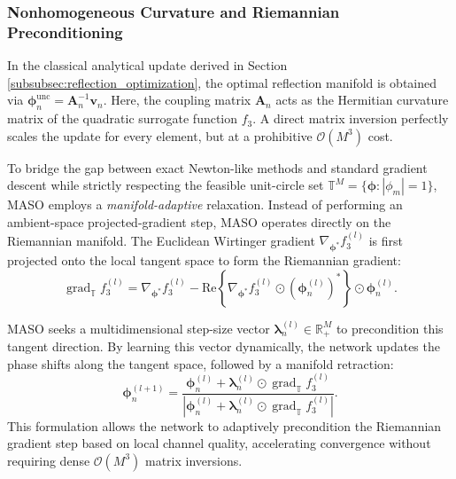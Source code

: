 \documentclass[journal]{IEEEtran}
\begin{document}
\subsubsection{Nonhomogeneous Curvature and Riemannian Preconditioning}
\label{subsubsec:neural_preconditioning}

In the classical analytical update derived in Section \ref{subsubsec:reflection_optimization}, the optimal reflection manifold is obtained via $\boldsymbol{\phi}_n^{\text{unc}} = \mathbf{A}_n^{-1} \mathbf{v}_n$. Here, the coupling matrix $\mathbf{A}_n$ acts as the Hermitian curvature matrix of the quadratic surrogate function $f_3$. A direct matrix inversion perfectly scales the update for every element, but at a prohibitive $\mathcal{O}(M^3)$ cost.

To bridge the gap between exact Newton-like methods and standard gradient descent while strictly respecting the feasible unit-circle set $\mathbb{T}^M = \{ \boldsymbol{\phi} : |\phi_m| = 1 \}$, MASO employs a \textit{manifold-adaptive} relaxation. Instead of performing an ambient-space projected-gradient step, MASO operates directly on the Riemannian manifold. The Euclidean Wirtinger gradient $\nabla_{\boldsymbol{\phi}^*} f_3^{(l)}$ is first projected onto the local tangent space to form the Riemannian gradient:
\begin{equation}
    \operatorname{grad}_{\mathbb{T}} f_3^{(l)} = \nabla_{\boldsymbol{\phi}^*} f_3^{(l)} - \text{Re} \left\{ \nabla_{\boldsymbol{\phi}^*} f_3^{(l)} \odot (\boldsymbol{\phi}_n^{(l)})^* \right\} \odot \boldsymbol{\phi}_n^{(l)}.
\end{equation}

MASO seeks a multidimensional step-size vector $\boldsymbol{\lambda}_n^{(l)} \in \mathbb{R}_+^M$ to precondition this tangent direction. By learning this vector dynamically, the network updates the phase shifts along the tangent space, followed by a manifold retraction:
\begin{equation}
    \boldsymbol{\phi}_n^{(l+1)} = \frac{\boldsymbol{\phi}_n^{(l)} + \boldsymbol{\lambda}_n^{(l)} \odot \operatorname{grad}_{\mathbb{T}} f_3^{(l)}}{\left| \boldsymbol{\phi}_n^{(l)} + \boldsymbol{\lambda}_n^{(l)} \odot \operatorname{grad}_{\mathbb{T}} f_3^{(l)} \right|}.
    \label{eq:maso_update}
\end{equation}
This formulation allows the network to adaptively precondition the Riemannian gradient step based on local channel quality, accelerating convergence without requiring dense $\mathcal{O}(M^3)$ matrix inversions.
\end{document}
